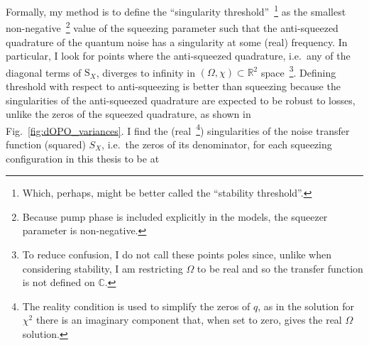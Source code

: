 Formally, my method is to define the ``singularity threshold''~\footnote{Which, perhaps, might be better called the ``stability threshold''.} as the smallest non-negative~\footnote{Because pump phase is included explicitly in the models, the squeezer parameter is non-negative.} value of the squeezing parameter such that the anti-squeezed quadrature of the quantum noise has a singularity at some (real) frequency. In particular, I look for points where the anti-squeezed quadrature, i.e.\ any of the diagonal terms of $\text{S}_X$, diverges to infinity in $(\Omega,\chi)\subset\mathbb{R}^2$ space~\footnote{To reduce confusion, I do not call these points poles since, unlike when considering stability, I am restricting $\Omega$ to be real and so the transfer function is not defined on $\mathbb{C}$.}. %
Defining threshold with respect to anti-squeezing is better than squeezing because the singularities of the anti-squeezed quadrature are expected to be robust to losses, unlike the zeros of the squeezed quadrature, as shown in Fig.~\ref{fig:dOPO_variances}. 
I find the (real~\footnote{The reality condition is used to simplify the zeros of $q$, as in the solution for $\chi^2$ there is an imaginary component that, when set to zero, gives the real $\Omega$ solution.}) singularities of the noise transfer function (squared) $S_X$, i.e.\ the zeros of its denominator, for each squeezing configuration in this thesis to be at 
\begingroup
\allowdisplaybreaks
